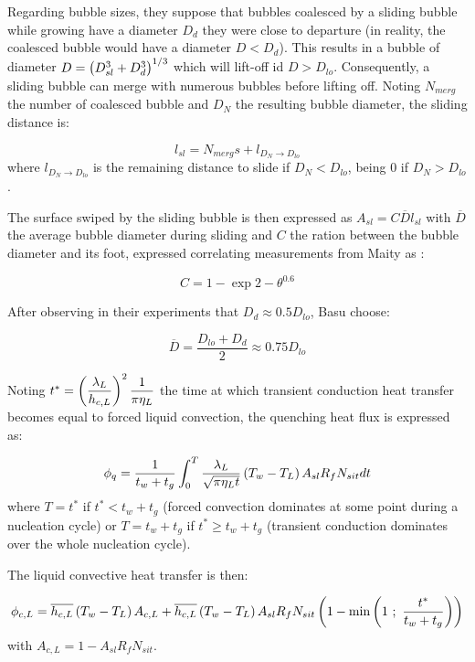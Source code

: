Regarding bubble sizes, they suppose that bubbles coalesced by a sliding bubble while growing have a diameter $D_{d}$ \ie they were close to departure (in reality, the coalesced bubble would have a diameter $D<D_{d}$). This results in a bubble of diameter $D=\left( D_{sl}^{3} + D_{d}^{3} \right)^{1/3}$ which will lift-off id $D>D_{lo}$. Consequently, a sliding bubble can merge with numerous bubbles before lifting off. Noting $N_{merg}$ the number of coalesced bubble and $D_{N}$ the resulting bubble diameter, the sliding distance is:

\begin{equation}
l_{sl}=N_{merg}s + l_{D_{N}\rightarrow D_{lo}}
\end{equation}
where $l_{D_{N}\rightarrow D_{lo}}$ is the remaining distance to slide if $D_{N}<D_{lo}$, being $0$ if $D_{N}>D_{lo}$.

The surface swiped by the sliding bubble is then expressed as $A_{sl} = C\overline{D}l_{sl}$ with $\overline{D}$ the average bubble diameter during sliding and $C$ the ration between the bubble diameter and its foot, expressed correlating measurements from Maity \cite{maity2000} as :

\begin{equation}
C=1-\exp{2-\theta ^{0.6}}
\end{equation}

After observing in their experiments that $D_{d}\approx 0.5D_{lo}$, Basu \etal choose:

\begin{equation}
\overline{D}=\frac{D_{lo}+D_{d}}{2}\approx 0.75D_{lo}
\end{equation}

Noting $t^{*}=\left( \dfrac{\lambda_{L}}{h_{c,L}} \right)^{2} \dfrac{1}{\pi \eta_{L}}$ the time at which transient conduction heat transfer becomes equal to forced liquid convection, the quenching heat flux is expressed as:

\begin{equation}
\phi_{q} = \frac{1}{t_{w}+t_{g}} \int_{0}^{T}\frac{\lambda_{L}}{\sqrt{\pi \eta_{L}t}}\left( T_{w}-T_{L} \right)A_{sl}R_{f}N_{sit}dt
\end{equation}
where $T=t^{*}$ if $t^{*}<t_{w}+t_{g}$ (forced convection dominates at some point during a nucleation cycle) or $T=t_{w}+t_{g}$ if $t^{*}\geq t_{w}+t_{g}$ (transient conduction dominates over the whole nucleation cycle).

\npar
The liquid convective heat transfer is then:

\begin{equation}
\phi_{c,L} = \overline{h_{c,L}}\parth{T_{w}-T_{L}}A_{c,L} + \overline{h_{c,L}}\parth{T_{w}-T_{L}}A_{sl}R_{f}N_{sit}\parth{1-\mathrm{min}\parth{1\ ;\ \frac{t^{*}}{t_{w}+t_{g}}}}
\label{eq:HFP_B_phiCL}
\end{equation}
with $A_{c,L} = 1 - A_{sl}R_{f}N_{sit}$.

